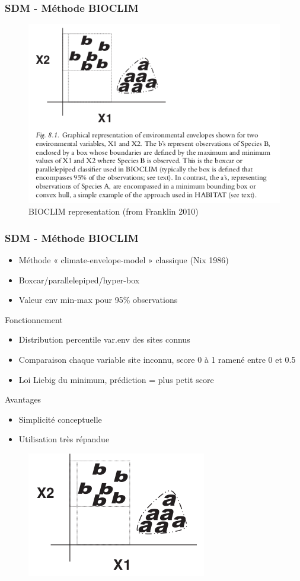 \documentclass[10pt]{beamer}
\begin{document}
\begin{frame}
  \frametitle{SDM - Méthode BIOCLIM}
  \begin{figure}
    \centering
    \includegraphics[scale=0.4]{bioclim-with-caption.png}
    \caption{BIOCLIM representation (from Franklin 2010)}
  \end{figure}
\end{frame}

\begin{frame}
  \frametitle{SDM - Méthode BIOCLIM}
  \begin{itemize}
    \item Méthode « climate-envelope-model » classique (Nix 1986)
    \item Boxcar/parallelepiped/hyper-box
    \item Valeur env min-max pour 95\% observations
  \end{itemize}
  Fonctionnement
  \begin{itemize}
    \item Distribution percentile var.env des sites connus
    \item Comparaison chaque variable site inconnu, score 0 à 1 ramené entre 0 et 0.5
    \item Loi Liebig du minimum, prédiction = plus petit score
  \end{itemize}
  Avantages
  \begin{itemize}
    \item Simplicité conceptuelle
    \item Utilisation très répandue
  \end{itemize}
  \begin{figure}
    \centering
    \includegraphics[scale=0.4]{bioclim-fig-only.png}
  \end{figure}
\end{frame}
\end{document}
